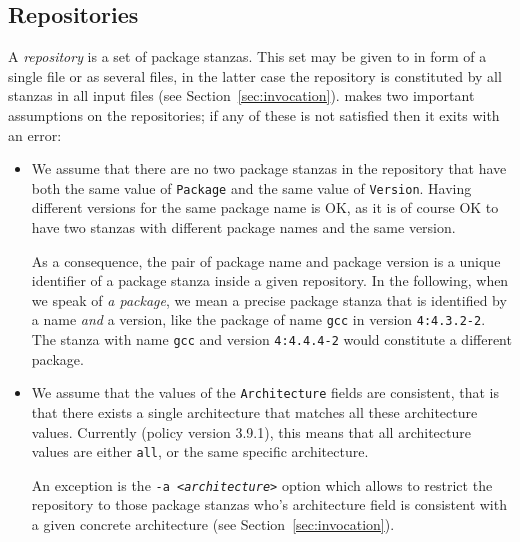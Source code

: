 \subsection{Repositories}
A \emph{repository} is a set of package stanzas. This set may be given
to \debcheck{} in form of a single file or as several files, in the
latter case the repository is constituted by all stanzas in all input
files (see Section~\ref{sec:invocation}). \debcheck{} makes two
important assumptions on the repositories; if any of these is not
satisfied then it exits with an error:

\begin{itemize}
\item
  We assume that there are no two package stanzas in the repository
  that have both the same value of \texttt{Package} and the same value
  of \texttt{Version}. Having different versions for the same package
  name is OK, as it is of course OK to have two stanzas with different
  package names and the same version.

  As a consequence, the pair of package name and package version is a
  unique identifier of a package stanza inside a given repository. In
  the following, when we speak of \emph{a package}, we mean a precise
  package stanza that is identified by a name \emph{and} a version,
  like the package of name \texttt{gcc} in version \texttt{4:4.3.2-2}.
  The stanza with name \texttt{gcc} and version \texttt{4:4.4.4-2}
  would constitute a different package.
\item
  We assume that the values of the \texttt{Architecture} fields are
  consistent, that is that there exists a single architecture that
  matches all these architecture values. Currently (policy version
  3.9.1), this means that all architecture values are either
  \texttt{all}, or the same specific architecture.

  An exception is the \texttt{-a \textit{<architecture>}} option which
  allows to restrict the repository to those package stanzas who's
  architecture field is consistent with a given concrete architecture
  (see Section~\ref{sec:invocation}).
\end{itemize}
